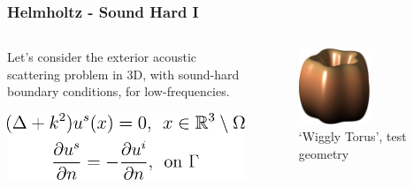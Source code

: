 \begin{frame}

    \frametitle{Helmholtz - Sound Hard I}

    \begin{columns}
        \begin{column}{0.5\textwidth}

            Let's consider the exterior acoustic scattering problem in 3D, with sound-hard
            boundary conditions, for low-frequencies.

            \hspace*{0.5pt}

            \centering
            \includegraphics[width=\textwidth]{assets/sound_hard_1.pdf}

        \end{column}

        \begin{column}{0.5\textwidth}
            \begin{center}
                \begin{figure}
                    \includegraphics[width=0.6\textwidth]{assets/wiggly_torus.pdf}
                    \caption*{`Wiggly Torus', test geometry}
                \end{figure}
            \end{center}
        \end{column}
\end{columns}

\end{frame}


